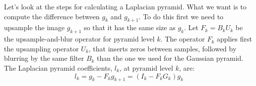 Let's look at the steps for calculating a Laplacian pyramid.
What we want is to compute the difference between $g_k$ and  $g_{k+1}$. To do this first we need to upsample the image $g_{k+1}$ so that it has the same size as $g_k$. Let $F_k = B_k U_k$ be the upsample-and-blur operator for pyramid level $k$.  The operator $F_k$ applies first the upsampling operator $U_k$, that inserts zeros between samples, followed by blurring by the same filter $B_k$ than the one we used for the Gaussian pyramid. The Laplacian pyramid coefficients, $l_k$, at pyramid level $k$, are:  
\begin{equation}
l_{k} =  g_k - F_k g_{k+1} =  (I_k - F_k G_k) g_{k} 
\end{equation}

